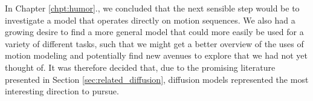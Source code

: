 
In Chapter \ref{chpt:humor}., we concluded that the next sensible step would be to investigate a model that operates directly on motion sequences. We also had a growing desire to find a more general model that could more easily be used for a variety of different tasks, such that we might get a better overview of the uses of motion modeling and potentially find new avenues to explore that we had not yet thought of. It was therefore decided that, due to the promising literature presented in Section \ref{sec:related_diffusion}, diffusion models represented the most interesting direction to pursue.
